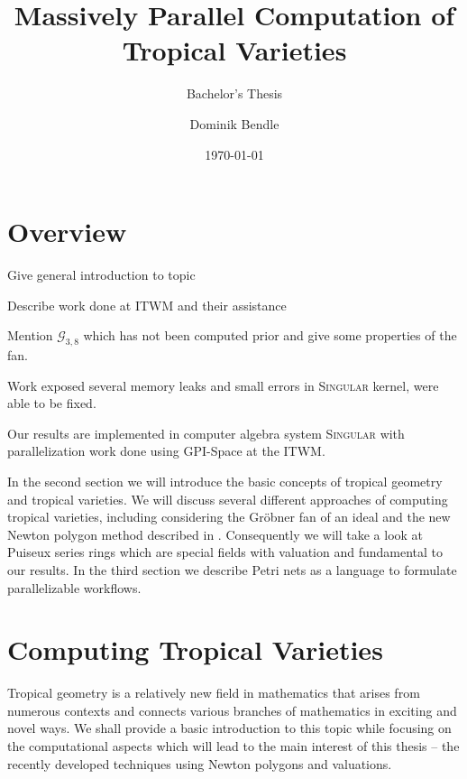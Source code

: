\documentclass[
  paper=a4,
  titlepage,
  bibliography=totoc,
  listof=totoc,
  pagesize=pdftex
]{scrartcl}
\title{Massively Parallel Computation of Tropical Varieties}
\subtitle{Bachelor's Thesis}
\author{Dominik Bendle}
\date{\today}
\numberwithin{figure}{section}
\numberwithin{equation}{section}
\numberwithin{table}{section}
\theoremstyle{definition}
\numberwithin{definition}{section}
\begin{document}
\pagestyle{headings}

\maketitle

\tableofcontents
\newpage

\section{Overview}

Give general introduction to topic

Describe work done at ITWM and their assistance

Mention $\mathcal G_{3,8}$ which has not been computed prior and give some properties of the
fan.

Work exposed several memory leaks and small errors in \textsc{Singular} kernel, were able
to be fixed.

Our results are implemented in computer algebra system \textsc{Singular} \cite{Singular}
with parallelization work done using GPI-Space at the ITWM.


In the second section we will introduce the basic concepts of tropical geometry and
tropical varieties. We will discuss several different approaches of computing tropical
varieties, including considering the Gröbner fan of an ideal and the new Newton polygon
method described in \cite{tropPointsLinks}. Consequently we will take a look at Puiseux
series rings which are special fields with valuation and fundamental to our results. In
the third section we describe Petri nets as a language to formulate parallelizable
workflows.


\section{Computing Tropical Varieties}

Tropical geometry is a relatively new field in mathematics that arises from numerous
contexts and connects various branches of mathematics in exciting and novel ways. We shall
provide a basic introduction to this topic while focusing on the computational aspects
which will lead to the main interest of this thesis -- the recently developed techniques
using Newton polygons and valuations.
\end{document}
